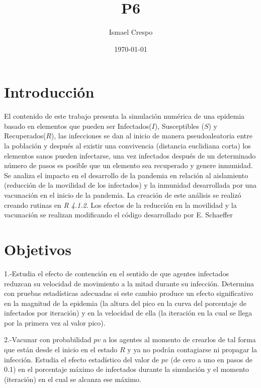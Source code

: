 \documentclass{article}
\title{P6}
\author{Ismael Crespo}
\date{\today}
\begin{document}
\maketitle

\section{Introducción}
El contenido de este trabajo presenta la simulación numérica de una epidemia basado en elementos que pueden ser Infectados($I$), Susceptibles ($S$) y Recuperados($R$), las infecciones se dan al inicio de manera pseudoaleatoria entre la población y después al existir una convivencia (distancia euclidiana corta) los elementos sanos pueden infectarse, una vez infectados después de un determinado número de pasos es posible que un elemento sea recuperado y genere inmunidad. Se analiza el impacto en el desarrollo de la pandemia en relación al aislamiento (reducción de la movilidad de los infectados) y la inmunidad desarrollada por una vacunación en el inicio de la pandemia. La creación de este análisis se realizó creando rutinas en \emph{R 4.1.2}. Los efectos de la reducción en la movilidad y la vacunación se realizan modificando el código desarrollado por E. Schaeffer \citep{E.Schaeffer}
\section{Objetivos}
1.-Estudia el efecto de contención en el sentido de que agentes infectados reduzcan su velocidad de movimiento a la mitad durante su infección. Determina con pruebas estadísticas adecuadas si este cambio produce un efecto significativo en la magnitud de la epidemia (la altura del pico en la curva del porcentaje de infectados por iteración) y en la velocidad de ella (la iteración en la cual se llega por la primera vez al valor pico).

2.-Vacunar con probabilidad $pv$ a los agentes al momento de crearlos de tal forma que están desde el inicio en el estado $R$ y ya no podrán contagiarse ni propagar la infección. Estudia el efecto estadístico del valor de $pv$ (de cero a uno en pasos de 0.1) en el porcentaje máximo de infectados durante la simulación y el momento (iteración) en el cual se alcanza ese máximo.
\end{document}
